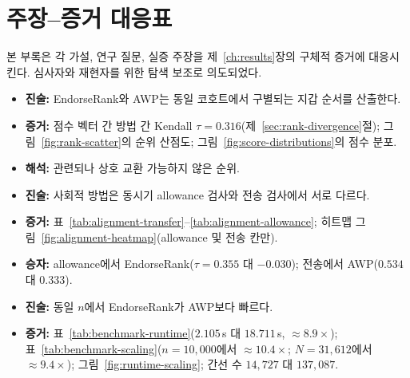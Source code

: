 \section{주장--증거 대응표}
\label{ch:appendix-claims}

본 부록은 각 가설, 연구 질문, 실증 주장을 제~\ref{ch:results}장의 구체적 증거에 대응시킨다. 심사자와 재현자를 위한 탐색 보조로 의도되었다.


\begin{itemize}
\item \textbf{진술:} EndorseRank와 AWP는 동일 코호트에서 구별되는 지갑 순서를 산출한다.

\item \textbf{증거:} 점수 벡터 간 방법 간 Kendall $\tau=0.316$(제~\ref{sec:rank-divergence}절); 그림~\ref{fig:rank-scatter}의 순위 산점도; 그림~\ref{fig:score-distributions}의 점수 분포.

\item \textbf{해석:} 관련되나 상호 교환 가능하지 않은 순위.
\end{itemize}


\begin{itemize}
\item \textbf{진술:} 사회적 방법은 동시기 allowance 검사와 전송 검사에서 서로 다르다.

\item \textbf{증거:} 표~\ref{tab:alignment-transfer}--\ref{tab:alignment-allowance}; 히트맵 그림~\ref{fig:alignment-heatmap}(allowance 및 전송 칸만).

\item \textbf{승자:} allowance에서 EndorseRank($\tau=0.355$ 대 $-0.030$); 전송에서 AWP($0.534$ 대 $0.333$).
\end{itemize}


\begin{itemize}
\item \textbf{진술:} 동일 $n$에서 EndorseRank가 AWP보다 빠르다.

\item \textbf{증거:} 표~\ref{tab:benchmark-runtime}($2.105$\,s 대 $18.711$\,s, $\approx 8.9\times$); 표~\ref{tab:benchmark-scaling}($n=10{,}000$에서 $\approx 10.4\times$; $N=31{,}612$에서 $\approx 9.4\times$); 그림~\ref{fig:runtime-scaling}; 간선 수 $14{,}727$ 대 $137{,}087$.
\end{itemize}

